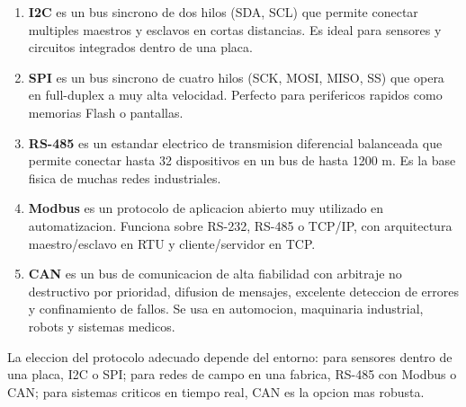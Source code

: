 \begin{enumerate}
    \item \textbf{I2C} es un bus sincrono de dos hilos (SDA, SCL) que permite
    conectar multiples maestros y esclavos en cortas distancias. Es ideal para
    sensores y circuitos integrados dentro de una placa.

    \item \textbf{SPI} es un bus sincrono de cuatro hilos (SCK, MOSI, MISO, SS)
    que opera en full-duplex a muy alta velocidad. Perfecto para perifericos
    rapidos como memorias Flash o pantallas.

    \item \textbf{RS-485} es un estandar electrico de transmision diferencial
    balanceada que permite conectar hasta 32 dispositivos en un bus de hasta
    1200 m. Es la base fisica de muchas redes industriales.

    \item \textbf{Modbus} es un protocolo de aplicacion abierto muy utilizado en
    automatizacion. Funciona sobre RS-232, RS-485 o TCP/IP, con arquitectura
    maestro/esclavo en RTU y cliente/servidor en TCP.

    \item \textbf{CAN} es un bus de comunicacion de alta fiabilidad con
    arbitraje no destructivo por prioridad, difusion de mensajes, excelente
    deteccion de errores y confinamiento de fallos. Se usa en automocion,
    maquinaria industrial, robots y sistemas medicos.
\end{enumerate}

La eleccion del protocolo adecuado depende del entorno: para sensores dentro de
una placa, I2C o SPI; para redes de campo en una fabrica, RS-485 con Modbus o
CAN; para sistemas criticos en tiempo real, CAN es la opcion mas robusta.
